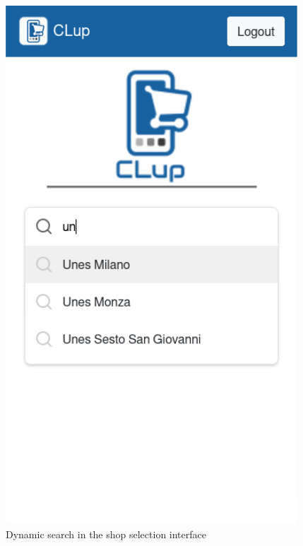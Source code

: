 \begin{figure}[H]
    \centering
    \includegraphics[scale=1]{Images/search-mockup.png}
    \caption{Dynamic search in the shop selection interface}
\end{figure}

